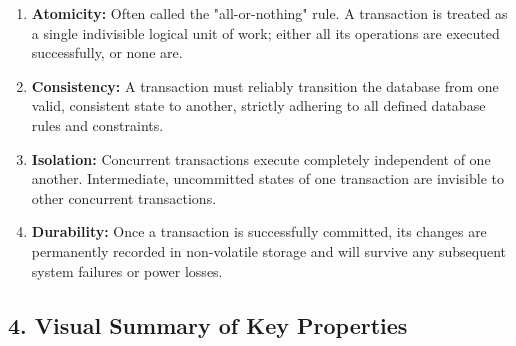 \documentclass[12pt,a3paper]{article}
\begin{document}
\begin{enumerate}
\begin{tcolorbox}[enhanced,breakable,ansbox,colback=cA!4,colframe=cA,boxrule=0.8pt,arc=5pt,title={\textbf{Answer}},fonttitle=\bfseries\color{white},colbacktitle=cA]
\begin{enumerate}
    \item \textbf{Atomicity:} Often called the "all-or-nothing" rule. A transaction is treated as a single indivisible logical unit of work; either all its operations are executed successfully, or none are.
    \item \textbf{Consistency:} A transaction must reliably transition the database from one valid, consistent state to another, strictly adhering to all defined database rules and constraints.
    \item \textbf{Isolation:} Concurrent transactions execute completely independent of one another. Intermediate, uncommitted states of one transaction are invisible to other concurrent transactions.
    \item \textbf{Durability:} Once a transaction is successfully committed, its changes are permanently recorded in non-volatile storage and will survive any subsequent system failures or power losses.
\end{enumerate}

\subsection*{4. Visual Summary of Key Properties}

\vspace{1.5em}
\begin{center}
\end{center}
\end{tcolorbox}
\end{enumerate}
\end{document}
